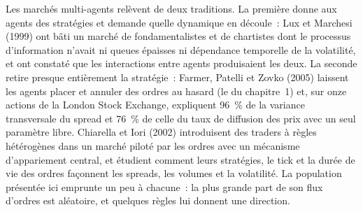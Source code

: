 Les marchés multi-agents relèvent de deux traditions. La première donne aux agents des stratégies et demande quelle dynamique en découle~: Lux et Marchesi (1999) ont bâti un marché de
fondamentalistes et de chartistes dont le processus d'information n'avait ni queues épaisses ni dépendance temporelle de la volatilité, et ont constaté que les interactions entre
agents produisaient les deux. La seconde retire presque entièrement la stratégie~: Farmer, Patelli et Zovko (2005) laissent les agents placer et annuler des ordres au hasard
(le  du chapitre~1) et, sur onze actions de la London Stock Exchange, expliquent 96~\% de la variance transversale du spread et 76~\% de
celle du taux de diffusion des prix avec un seul paramètre libre. Chiarella et Iori (2002) introduisent des traders à règles hétérogènes dans un marché piloté par les ordres avec
un mécanisme d'appariement central, et étudient comment leurs stratégies, le tick et la durée de vie des ordres façonnent les spreads, les volumes et la volatilité. La population
présentée ici emprunte un peu à chacune~: la plus grande part de son flux d'ordres est aléatoire, et quelques règles lui donnent une direction.

